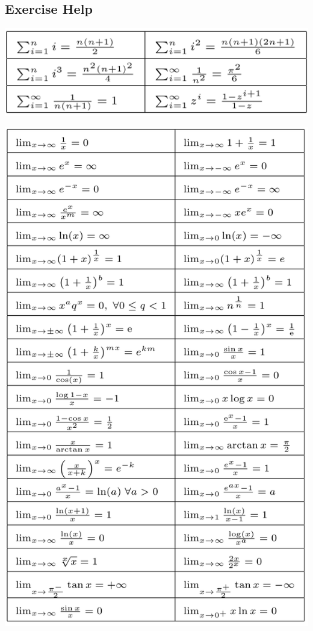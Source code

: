 \subsection{Exercise Help}
\includegraphics[width=0.4\linewidth]{./assets/series.png}
\begin{multicols}{2}

    \includegraphics[height=0.5\textheight]{./assets/limits.png}



\end{multicols}
